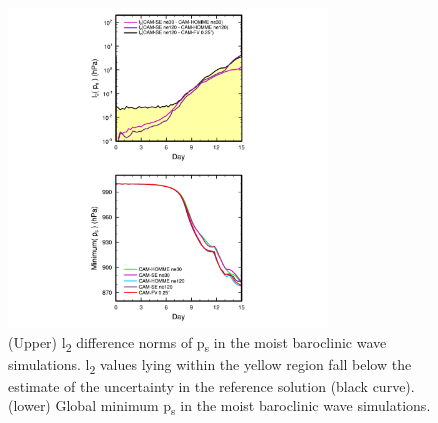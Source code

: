 \begin{figure}[h]
\centering
\includegraphics[width=20pc]{figs/l2.pdf}
\caption{(Upper) l\textsubscript{2} difference norms of p\textsubscript{s} in the moist baroclinic wave simulations. l\textsubscript{2} values lying within the yellow region fall below the estimate of the uncertainty in the reference solution (black curve). (lower) Global minimum p\textsubscript{s} in the moist baroclinic wave simulations.}
\label{fig:l2norm}
\end{figure}
